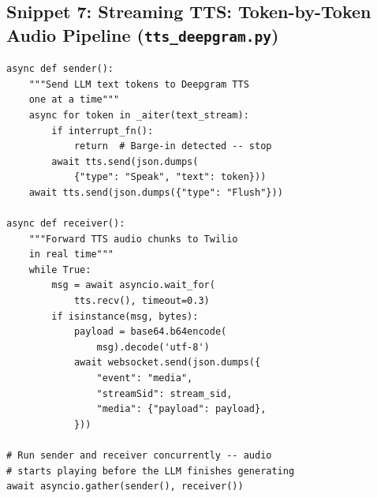 \documentclass[conference]{IEEEtran}
\begin{document}
\subsection*{Snippet 7: Streaming TTS: Token-by-Token Audio Pipeline (\texttt{tts\_deepgram.py})}
\begin{lstlisting}[caption={Concurrent sender/receiver for real-time TTS streaming}]
async def sender():
    """Send LLM text tokens to Deepgram TTS
    one at a time"""
    async for token in _aiter(text_stream):
        if interrupt_fn():
            return  # Barge-in detected -- stop
        await tts.send(json.dumps(
            {"type": "Speak", "text": token}))
    await tts.send(json.dumps({"type": "Flush"}))

async def receiver():
    """Forward TTS audio chunks to Twilio
    in real time"""
    while True:
        msg = await asyncio.wait_for(
            tts.recv(), timeout=0.3)
        if isinstance(msg, bytes):
            payload = base64.b64encode(
                msg).decode('utf-8')
            await websocket.send(json.dumps({
                "event": "media",
                "streamSid": stream_sid,
                "media": {"payload": payload},
            }))

# Run sender and receiver concurrently -- audio
# starts playing before the LLM finishes generating
await asyncio.gather(sender(), receiver())
\end{lstlisting}
\end{document}
